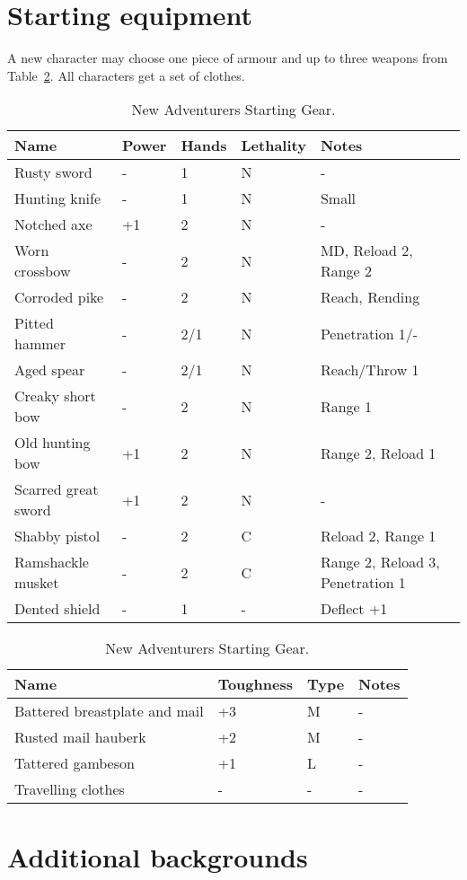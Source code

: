 \documentclass[a4paper,11pt,oneside]{book}
\begin{document}
\section{Starting equipment}
A new character may choose one piece of armour and up to three weapons from Table~\ref{tab:start-gear}. All characters get a set of clothes.
\begin{table}[ht!]
	\centering
	\caption{New Adventurers Starting Gear.}
	\label{tab:start-gear}
	\begin{tabular}{|l|l|l|l|l|}
		\hline
		Name & Power & Hands &  Lethality & Notes\\
		\hline
		Rusty sword & - & 1 & N & -\\
		Hunting knife & - & 1 & N & Small\\
		Notched axe & +1 & 2 & N & -\\
		Worn crossbow & - & 2 & N & MD, Reload 2, Range 2\\
		Corroded pike & - & 2 & N & Reach, Rending\\
		Pitted hammer & - & 2/1 & N & Penetration 1/- \\
		Aged spear & - & 2/1 & N & Reach/Throw 1\\
		Creaky short bow & - & 2 & N & Range 1\\
		Old hunting bow & +1 & 2 & N & Range 2, Reload 1\\
		Scarred great sword & +1 & 2 & N & -\\
		Shabby pistol & - & 2 & C & Reload 2, Range 1 \\
		Ramshackle musket & - & 2 & C & Range 2, Reload 3, Penetration 1 \\
		Dented shield & - & 1 & - & Deflect +1 \\
		\hline
	\end{tabular}
	\begin{tabular}{|l|l|l|l|}	
		\hline
		Name & Toughness & Type & Notes\\
		\hline
		Battered breastplate and mail & +3 & M & - \\
		Rusted mail hauberk & +2 & M & - \\
		Tattered gambeson & +1 & L & - \\
		Travelling clothes & - & - & - \\
		\hline
	\end{tabular}
\end{table}


\section{Additional backgrounds}
\end{document}
